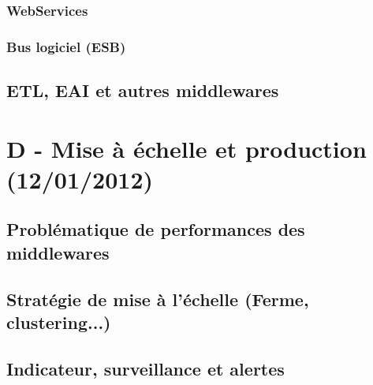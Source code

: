 \subsubsection{WebServices}

\subsubsection{Bus logiciel (ESB)}
\subsection{ETL, EAI et autres middlewares}

\section{D - Mise à échelle et production (12/01/2012)}

\subsection{Problématique de performances des middlewares}

\subsection{Stratégie de mise à l'échelle (Ferme, clustering...)}

\subsection{Indicateur, surveillance et alertes}

